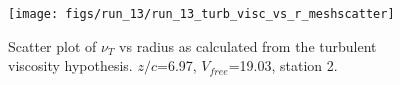 \begin{figure}[H]
\centering
\texttt{[image: figs/run\_13/run\_13\_turb\_visc\_vs\_r\_meshscatter]}
\caption{Scatter plot of $\nu_T$ vs radius as calculated from the turbulent viscosity hypothesis. $z/c$=6.97, $V_{free}$=19.03, station 2.}
\label{fig:run_13_turb_visc_vs_r_meshscatter}
\end{figure}


